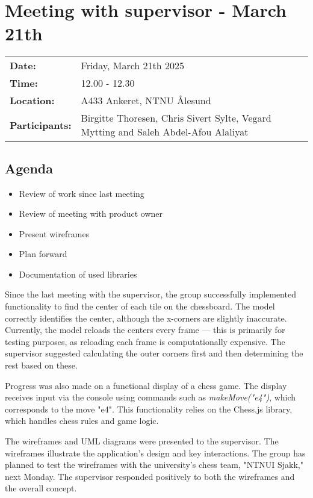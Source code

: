 \section{Meeting with supervisor - March 21th}
\begin{tabular}{ll}
    \textbf{Date:} & Friday, March 21th 2025 \\
    \textbf{Time:} & 12.00 - 12.30\\
    \textbf{Location:} & A433 Ankeret, NTNU Ålesund \\
    \textbf{Participants:} & Birgitte Thoresen, Chris Sivert Sylte, Vegard Mytting and Saleh Abdel-Afou Alaliyat\\
\end{tabular}

\vspace{0.5cm}

\subsection{Agenda}

\begin{itemize} 
    \item Review of work since last meeting 
    \item Review of meeting with product owner 
    \item Present wireframes 
    \item Plan forward 
    \item Documentation of used libraries 
\end{itemize}

Since the last meeting with the supervisor, the group successfully implemented functionality to find the center of each tile on the chessboard. The model correctly identifies the center, although the x-corners are slightly inaccurate. Currently, the model reloads the centers every frame — this is primarily for testing purposes, as reloading each frame is computationally expensive. The supervisor suggested calculating the outer corners first and then determining the rest based on these.

Progress was also made on a functional display of a chess game. The display receives input via the console using commands such as \textit{makeMove("e4")}, which corresponds to the move "e4". This functionality relies on the Chess.js library, which handles chess rules and game logic.

The wireframes and UML diagrams were presented to the supervisor. The wireframes illustrate the application's design and key interactions. The group has planned to test the wireframes with the university's chess team, "NTNUI Sjakk," next Monday. The supervisor responded positively to both the wireframes and the overall concept.

